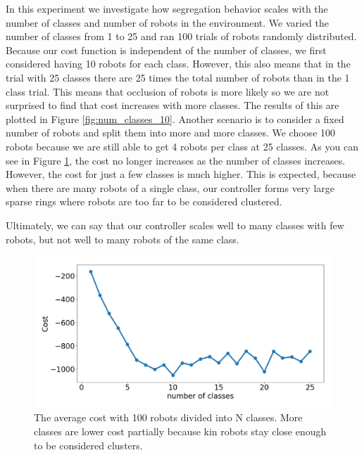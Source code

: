 \documentclass[conference]{IEEEtran}
\begin{document}
    In this experiment we investigate how segregation behavior scales with the number of classes and number of robots in the environment. We varied the number of classes from 1 to 25 and ran 100 trials of robots randomly distributed. Because our cost function is independent of the number of classes, we first considered having 10 robots for each class. However, this also means that in the trial with 25 classes there are 25 times the total number of robots than in the 1 class trial. This means that occlusion of robots is more likely so we are not surprised to find that cost increases with more classes. The results of this are plotted in Figure  \ref{fig:num_classes_10}. Another scenario is to consider a fixed number of robots and split them into more and more classes. We choose 100 robots because we are still able to get 4 robots per class at 25 classes. As you can see in Figure \ref{fig:num_classes_100}, the cost no longer increases as the number of classes increases. However, the cost for just a few classes is much higher. This is expected, because when there are many robots of a single class, our controller forms very large sparse rings where robots are too far to be considered clustered.

    Ultimately, we can say that our controller scales well to many classes with few robots, but not well to many robots of the same class.

    \begin{figure}[H]
      \centering
      \includegraphics[width=1\linewidth]{./images/num_classes_vs_cost_100_robots.png}
      \caption{The average cost with 100 robots divided into N classes. More classes are lower cost partially because kin robots stay close enough to be considered clusters.}
      \label{fig:num_classes_100}
    \end{figure}
\end{document}
